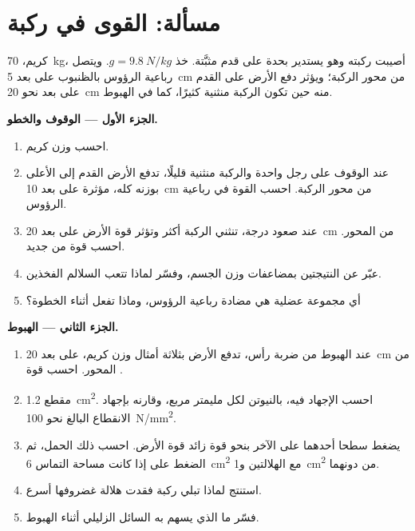 \section{مسألة: القوى في ركبة}

\begin{problem}
\label{pb:g10:muscles-and-joints:1}
كريم، \qty{70}{kg}، أصيبت ركبته وهو يستدير بحدة على قدم مثبَّتة. خذ
$g = \qty{9.8}{N/kg}$. ويتصل  رباعية الرؤوس بالظنبوب على بعد
\qty{5}{cm} من محور الركبة؛ ويؤثر دفع الأرض على القدم على بعد نحو
\qty{20}{cm} منه حين تكون الركبة منثنية كثيرًا، كما في الهبوط.

\medskip
\noindent\textbf{الجزء الأول --- الوقوف والخطو.}
\begin{enumerate}
  \item احسب وزن كريم.
  \item عند الوقوف على رجل واحدة والركبة منثنية قليلًا، تدفع الأرض
        القدم إلى الأعلى بوزنه كله، مؤثرة على بعد \qty{10}{cm} من محور
        الركبة. احسب القوة في  رباعية الرؤوس.
  \item عند صعود درجة، تنثني الركبة أكثر وتؤثر قوة الأرض على بعد
        \qty{20}{cm} من المحور. احسب قوة  من جديد.
  \item عبّر عن النتيجتين بمضاعفات وزن الجسم، وفسّر لماذا تتعب السلالم
        الفخذين.
  \item أي مجموعة عضلية هي مضادة رباعية الرؤوس، وماذا تفعل أثناء
        الخطوة؟
\end{enumerate}

\medskip
\noindent\textbf{الجزء الثاني --- الهبوط.}
\begin{enumerate}[resume]
  \item عند الهبوط من ضربة رأس، تدفع الأرض بثلاثة أمثال وزن كريم، على
        بعد \qty{20}{cm} من المحور. احسب قوة .
  \item مقطع  \qty{1.2}{cm^2}. احسب الإجهاد فيه، بالنيوتن لكل
        مليمتر مربع، وقارنه بإجهاد الانقطاع البالغ نحو
        \qty{100}{N/mm^2}.
  \item يضغط سطحا  أحدهما على الآخر بنحو قوة  زائد قوة
        الأرض. احسب ذلك الحمل، ثم الضغط على  إذا كانت مساحة
        التماس \qty{6}{cm^2} مع الهلالتين و\qty{1}{cm^2} من دونهما.
  \item استنتج لماذا تبلي ركبة فقدت هلالة غضروفها أسرع.
  \item فسّر ما الذي يسهم به السائل الزليلي أثناء الهبوط.
\end{enumerate}


\end{problem}
